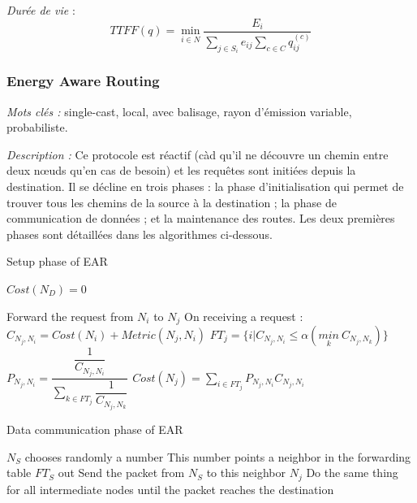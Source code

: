 \emph{Durée de vie} :  $$TTFF(q) = \min\limits_{i \in N}\frac{E_i}{\sum \limits_{j \in S_i} {e_{ij}} \sum \limits_{c \in C} {q_{ij}^{(c)}}}$$



\subsubsection{Energy Aware Routing \cite{Shah2002}}
\emph{Mots clés :} single-cast, local, avec balisage, rayon d'émission variable, probabiliste.

\emph{Description :}
Ce protocole est réactif (càd qu'il ne découvre un chemin entre deux nœuds qu’en cas de besoin) et les requêtes sont initiées depuis la destination. Il se décline en trois phases : la phase d'initialisation qui permet de trouver tous les chemins de la source à la destination ; la phase de communication de données ; et la maintenance des routes. Les deux premières phases sont détaillées dans les algorithmes ci-dessous.

\begin{algorithm}[H]
\caption{Setup phase of EAR}
\label{algo_EAR_sp}
\begin{algorithmic}

\STATE $Cost(N_D) = 0$

			\STATE Forward the request from $N_i$ to $N_j$
		\ENDIF
	\ENDFOR
\ENDFOR
\STATE
{}
		\STATE On receiving a request :
		\STATE $C_{N_j,N_i} = Cost(N_i)+Metric(N_j,N_i)$
		\STATE $FT_j = \{i | C_{N_j,N_i} \leq \alpha (\underset{k}{min}\ C_{N_j,N_k})\}$
		\STATE
		\STATE $P_{N_j,N_i} = \dfrac{\dfrac{1}{C_{N_j,N_i}}}{\sum \limits_{k \in FT_j} \dfrac{1}{C_{N_j,N_k}}}$
		\STATE
		\STATE $Cost(N_j) = \sum \limits_{i \in FT_j} {P_{N_j,N_i} C_{N_j,N_i}}$
	\ENDFOR
\ENDFOR
\end{algorithmic}
\end{algorithm}


\begin{algorithm}[H]
\caption{Data communication phase of EAR}
\label{algo_EAR_dcp}
\begin{algorithmic}

\STATE $N_S$ chooses randomly a number
\STATE This number points a neighbor in the forwarding table $FT_S$ out
\STATE Send the packet from $N_S$ to this neighbor $N_j$
\STATE Do the same thing for all intermediate nodes until the packet reaches the destination

\end{algorithmic}
\end{algorithm}


